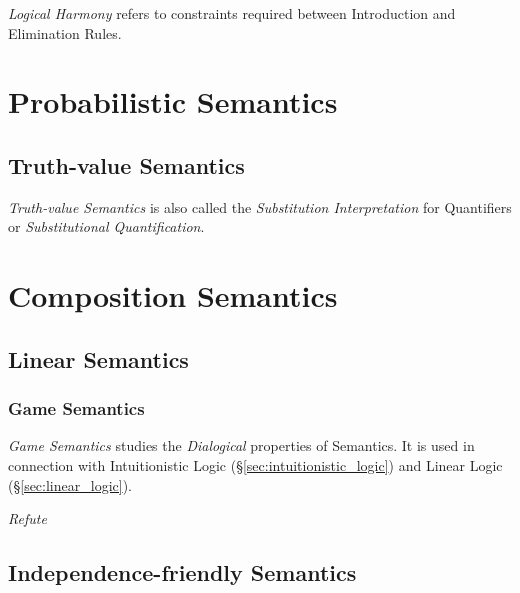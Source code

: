 \emph{Logical Harmony} refers to constraints required between
Introduction and Elimination Rules.



\section{Probabilistic Semantics}

\subsection{Truth-value Semantics}

\emph{Truth-value Semantics} is also called the \emph{Substitution
  Interpretation} for Quantifiers or \emph{Substitutional
  Quantification}.



\section{Composition Semantics}

\subsection{Linear Semantics}

\subsubsection{Game Semantics}

\emph{Game Semantics} studies the \emph{Dialogical} properties of
Semantics. It is used in connection with Intuitionistic Logic
(\S\ref{sec:intuitionistic_logic}) and Linear Logic
(\S\ref{sec:linear_logic}).

\emph{Refute}



\subsection{Independence-friendly Semantics}

